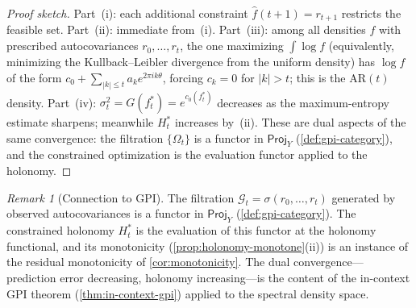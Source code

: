 \documentclass[12pt]{amsart}
\theoremstyle{definition}
\theoremstyle{remark}
\newtheorem*{remark}{Remark}
\newcommand{\Proj}{\mathsf{Proj}}
\begin{document}
\begin{proof}[Proof sketch]
Part~(i): each additional constraint $\widehat{f}(t+1) = r_{t+1}$ restricts the feasible set. Part~(ii): immediate from~(i). Part~(iii): among all densities $f$ with prescribed autocovariances $r_0, \ldots, r_t$, the one maximizing $\int \log f$ (equivalently, minimizing the Kullback--Leibler divergence from the uniform density) has $\log f$ of the form $c_0 + \sum_{|k| \leq t} a_k e^{2\pi ik\theta}$, forcing $c_k = 0$ for $|k| > t$; this is the AR$(t)$ density. Part~(iv): $\sigma_t^2 = G(f_t^*) = e^{c_0(f_t^*)}$ decreases as the maximum-entropy estimate sharpens; meanwhile $H_t^*$ increases by~(ii). These are dual aspects of the same convergence: the filtration $\{\Omega_t\}$ is a functor in $\Proj_Y$ (\cref{def:gpi-category}), and the constrained optimization is the evaluation functor applied to the holonomy.
\end{proof}

\begin{remark}[Connection to GPI]
The filtration $\mathcal{G}_t = \sigma(r_0, \ldots, r_t)$ generated by observed autocovariances is a functor in $\Proj_Y$ (\cref{def:gpi-category}). The constrained holonomy $H_t^*$ is the evaluation of this functor at the holonomy functional, and its monotonicity (\cref{prop:holonomy-monotone}(ii)) is an instance of the residual monotonicity of \cref{cor:monotonicity}. The dual convergence---prediction error decreasing, holonomy increasing---is the content of the in-context GPI theorem (\cref{thm:in-context-gpi}) applied to the spectral density space.
\end{remark}
\end{document}
